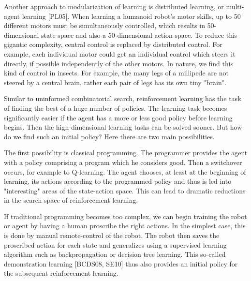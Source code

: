 \documentclass[10pt]{article}
\begin{document}
Another approach to modularization of learning is distributed learning, or multi-agent learning [PL05]. When learning a humanoid robot's motor skills, up to 50 different motors must be simultaneously controlled, which results in 50-dimensional state space and also a 50-dimensional action space. To reduce this gigantic complexity, central control is replaced by distributed control. For example, each individual motor could get an individual control which steers it directly, if possible independently of the other motors. In nature, we find this kind of control in insects. For example, the many legs of a millipede are not steered by a central brain, rather each pair of legs has its own tiny "brain".

Similar to uninformed combinatorial search, reinforcement learning has the task of finding the best of a huge number of policies. The learning task becomes significantly easier if the agent has a more or less good policy before learning begins. Then the high-dimensional learning tasks can be solved sooner. But how do we find such an initial policy? Here there are two main possibilities.

The first possibility is classical programming. The programmer provides the agent with a policy comprising a program which he considers good. Then a switchover occurs, for example to Q-learning. The agent chooses, at least at the beginning of learning, its actions according to the programmed policy and thus is led into "interesting" areas of the state-action space. This can lead to dramatic reductions in the search space of reinforcement learning.

If traditional programming becomes too complex, we can begin training the robot or agent by having a human proscribe the right actions. In the simplest case, this is done by manual remote-control of the robot. The robot then saves the proscribed action for each state and generalizes using a supervised learning algorithm such as backpropagation or decision tree learning. This so-called demonstration learning [BCDS08, SE10] thus also provides an initial policy for the subsequent reinforcement learning.
\end{document}
